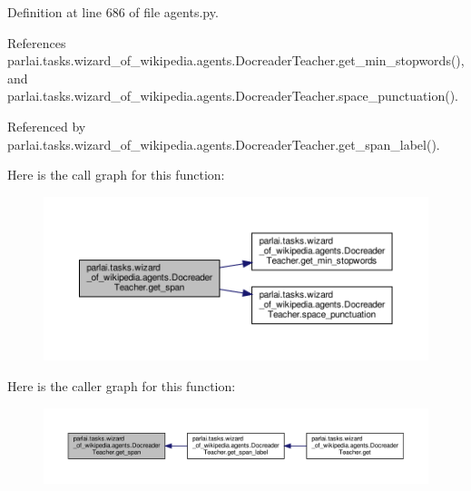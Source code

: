 Definition at line 686 of file agents.\+py.



References parlai.\+tasks.\+wizard\+\_\+of\+\_\+wikipedia.\+agents.\+Docreader\+Teacher.\+get\+\_\+min\+\_\+stopwords(), and parlai.\+tasks.\+wizard\+\_\+of\+\_\+wikipedia.\+agents.\+Docreader\+Teacher.\+space\+\_\+punctuation().



Referenced by parlai.\+tasks.\+wizard\+\_\+of\+\_\+wikipedia.\+agents.\+Docreader\+Teacher.\+get\+\_\+span\+\_\+label().

Here is the call graph for this function\+:
\nopagebreak
\begin{figure}[H]
\begin{center}
\leavevmode
\includegraphics[width=350pt]{classparlai_1_1tasks_1_1wizard__of__wikipedia_1_1agents_1_1DocreaderTeacher_a4711260e72f13e7aab1f621030762847_cgraph}
\end{center}
\end{figure}
Here is the caller graph for this function\+:
\nopagebreak
\begin{figure}[H]
\begin{center}
\leavevmode
\includegraphics[width=350pt]{classparlai_1_1tasks_1_1wizard__of__wikipedia_1_1agents_1_1DocreaderTeacher_a4711260e72f13e7aab1f621030762847_icgraph}
\end{center}
\end{figure}
\mbox{\label{classparlai_1_1tasks_1_1wizard__of__wikipedia_1_1agents_1_1DocreaderTeacher_a0c5490abc01892bfdfe24f7efdfe97e4}} 
